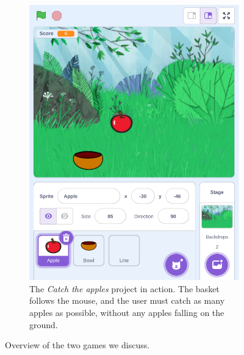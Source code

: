\documentclass[../main]{subfiles}
\begin{document}
\begin{figure}
\begin{wide}
\begin{subfigure}[T]{0.49\linewidth}
            \includegraphics[width=\linewidth]{apple-game}
            \caption{
                The \textit{Catch the apples} project in action.
                The basket follows the mouse, and the user must catch as many apples as possible, without any apples falling on the ground.
            }
            \label{fig:the-game-apple}
        \end{subfigure}
    \end{wide}
    \caption{
        Overview of the two games we discuss.
    }
    \label{fig:the-game}
\end{figure}

\end{document}
